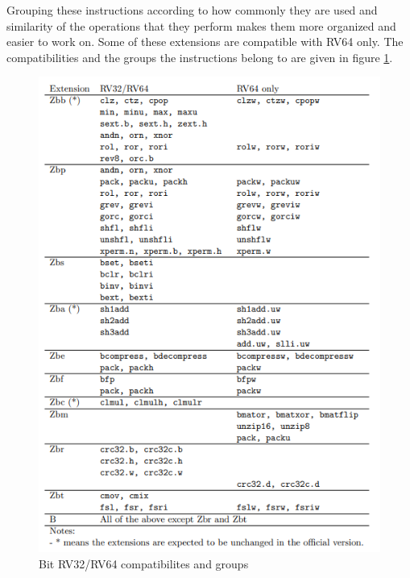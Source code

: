 Grouping these instructions according to how commonly they are used and similarity of the operations that they perform makes them more organized and easier to work on. 
Some of these extensions are compatible with RV64 only. The compatibilities and the groups the instructions belong to are given in figure \ref{fig:rv32_rv64_compatibilities_and_groups}.
\begin{figure}[h!]
    \centering
    \includegraphics{riscv/rv32_rv64_compatibilities_and_groups.png}
    \caption{Bit RV32/RV64 compatibilites and groups \cite{bitmanipdraft}}
    \label{fig:rv32_rv64_compatibilities_and_groups}
\end{figure}

\clearpage

